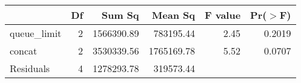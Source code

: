 \begin{table}[ht]
\centering
\begin{tabular}{lrrrrr}
  \hline
 & Df & Sum Sq & Mean Sq & F value & Pr($>$F) \\ 
  \hline
queue\_limit & 2 & 1566390.89 & 783195.44 & 2.45 & 0.2019 \\ 
  concat & 2 & 3530339.56 & 1765169.78 & 5.52 & 0.0707 \\ 
  Residuals & 4 & 1278293.78 & 319573.44 &  &  \\ 
   \hline
\end{tabular}
\end{table}
